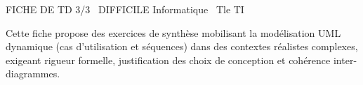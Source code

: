 \documentclass[11pt]{article}
\begin{document}
\begin{tcolorbox}[enhanced,colback=popink,colframe=popink,arc=10pt,boxrule=0pt,left=12pt,right=12pt,top=9pt,bottom=9pt]
{\color{white}\popxbold\small FICHE DE TD 3/3 \textbullet\ DIFFICILE \hfill Informatique \textbullet\ Tle TI\par}
\end{tcolorbox}
\vspace{4pt}
Cette fiche propose des exercices de synthèse mobilisant la modélisation UML dynamique (cas d'utilisation et séquences) dans des contextes réalistes complexes, exigeant rigueur formelle, justification des choix de conception et cohérence inter-diagrammes.
\end{document}
